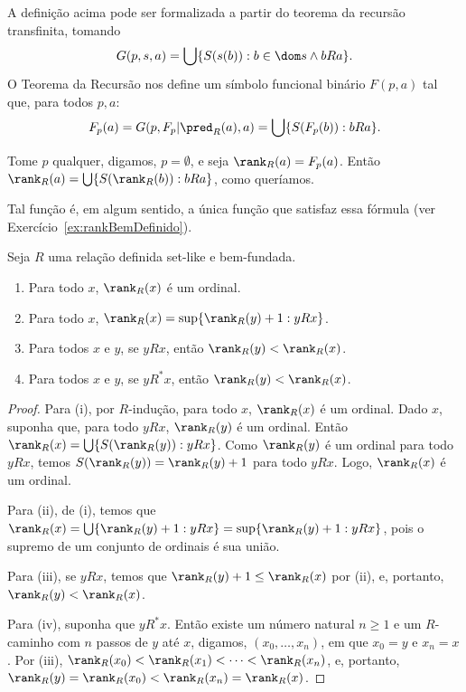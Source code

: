 A definição acima pode ser formalizada a partir do teorema da recursão transfinita, tomando
\[
    G(p, s, a)=\bigcup\{S(s(b)): b\in \dom s \land b R a\}.
\]
O Teorema da Recursão nos define um símbolo funcional binário $F(p, a)$ tal que, para todos $p, a$:
\[
    F_p(a)=G(p, F_p|\pred_{R}(a), a)=\bigcup\{S(F_p(b)): b R a\}.
\]

Tome $p$ qualquer, digamos, $p=\emptyset$, e seja $\rank_R(a)=F_p(a)$.
Então $\rank_R(a)=\bigcup\{S(\rank_R(b)): b R a\}$, como queríamos.

Tal função é, em algum sentido, a única função que satisfaz essa fórmula (ver Exercício~\ref{ex:rankBemDefinido}).

\begin{lemma}[$\ZFmP$]\label{lem:propriedadesRank}
    Seja $R$ uma relação definida set-like e bem-fundada.
    \begin{enumerate}[label=(\roman*)]
        \item Para todo $x$, $\rank_R(x)$ é um ordinal.
        \item Para todo $x$, $\rank_R(x)=\sup\{\rank_R(y)+1: y R x\}$.
        \item Para todos $x$ e $y$, se $y R x$, então $\rank_R(y)<\rank_R(x)$.
        \item Para todos $x$ e $y$, se $y R^* x$, então $\rank_R(y)<\rank_R(x)$.
    \end{enumerate}
\end{lemma}
\begin{proof}
    Para (i), por $R$-indução, para todo $x$, $\rank_R(x)$ é um ordinal.
    Dado $x$, suponha que, para todo $y R x$, $\rank_R(y)$ é um ordinal.
    Então $\rank_R(x)=\bigcup\{S(\rank_R(y)): y R x\}$.
    Como $\rank_R(y)$ é um ordinal para todo $y R x$, temos $S(\rank_R(y))=\rank_R(y)+1$ para todo $y R x$.
    Logo, $\rank_R(x)$ é um ordinal.

    Para (ii), de (i), temos que $\rank_R(x)=\bigcup\{\rank_R(y)+1: y R x\}=\sup\{\rank_R(y)+1: y R x\}$, pois o supremo de um conjunto de ordinais é sua união.

    Para (iii), se $y R x$, temos que $\rank_R(y)+1\leq \rank_R(x)$ por (ii), e, portanto, $\rank_R(y)<\rank_R(x)$.

    Para (iv), suponha que $y R^* x$.
    Então existe um número natural $n\geq 1$ e um $R$-caminho com $n$ passos de $y$ até $x$, digamos, $(x_0,\dots,x_n)$, em que $x_0=y$ e $x_n=x$.
    Por (iii), $\rank_R(x_0)<\rank_R(x_1)<\cdots <\rank_R(x_n)$, e, portanto, $\rank_R(y)=\rank_R(x_0)<\rank_R(x_n)=\rank_R(x)$.
\end{proof}


